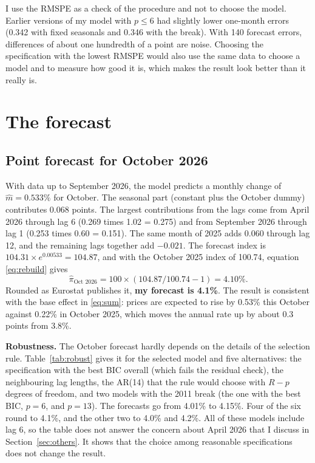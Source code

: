 \documentclass[11pt]{article}
\begin{document}
I use the RMSPE as a check of the procedure and not to choose the model. Earlier versions of my model with $p\le6$ had slightly lower one-month errors (0.342 with fixed seasonals and 0.346 with the break). With 140 forecast errors, differences of about one hundredth of a point are noise. Choosing the specification with the lowest RMSPE would also use the same data to choose a model and to measure how good it is, which makes the result look better than it really is.

\section{The forecast}
\label{sec:fc}

\subsection{Point forecast for October 2026}

With data up to September 2026, the model predicts a monthly change of $\hat m = 0.533\%$ for October. The seasonal part (constant plus the October dummy) contributes 0.068 points. The largest contributions from the lags come from April 2026 through lag 6 (0.269 times 1.02 = 0.275) and from September 2026 through lag 1 (0.253 times 0.60 = 0.151). The same month of 2025 adds 0.060 through lag 12, and the remaining lags together add $-0.021$. The forecast index is $104.31\times e^{0.00533}=104.87$, and with the October 2025 index of 100.74, equation \eqref{eq:rebuild} gives
\[
\hat\pi_{\text{Oct 2026}} = 100\times(104.87/100.74 - 1) = 4.10\%.
\]
Rounded as Eurostat publishes it, \textbf{my forecast is 4.1\%}. The result is consistent with the base effect in \eqref{eq:sum}: prices are expected to rise by 0.53\% this October against 0.22\% in October 2025, which moves the annual rate up by about 0.3 points from 3.8\%.

\textbf{Robustness.} The October forecast hardly depends on the details of the selection rule. Table~\ref{tab:robust} gives it for the selected model and five alternatives: the specification with the best BIC overall (which fails the residual check), the neighbouring lag lengths, the AR(14) that the rule would choose with $R-p$ degrees of freedom, and two models with the 2011 break (the one with the best BIC, $p=6$, and $p=13$). The forecasts go from 4.01\% to 4.15\%. Four of the six round to 4.1\%, and the other two to 4.0\% and 4.2\%. All of these models include lag 6, so the table does not answer the concern about April 2026 that I discuss in Section~\ref{sec:others}. It shows that the choice among reasonable specifications does not change the result.
\end{document}
